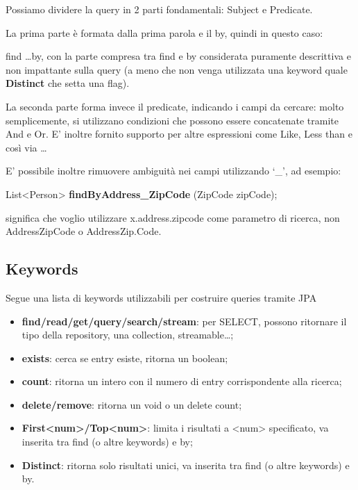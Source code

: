 Possiamo dividere la query in 2 parti fondamentali: Subject e Predicate.

La prima parte è formata dalla prima parola e il by, quindi in questo caso:

find \dots by, con la parte compresa tra find e by considerata puramente descrittiva e non impattante sulla query (a meno che non venga utilizzata una keyword quale \textbf{Distinct} che setta una flag).

La seconda parte forma invece il predicate, indicando i campi da cercare: molto semplicemente, si utilizzano condizioni che possono essere concatenate tramite And e Or. E' inoltre fornito supporto per altre espressioni come Like, Less than e così via \dots 

E' possibile inoltre rimuovere ambiguità nei campi utilizzando `\_', ad esempio:

List<Person> \textbf{findByAddress\_ZipCode} (ZipCode zipCode);

significa che voglio utilizzare x.address.zipcode come parametro di ricerca, non AddressZipCode o AddressZip.Code.

\subsection{Keywords}
Segue una lista di keywords utilizzabili per costruire queries tramite JPA\@
\begin{itemize}
    \item \textbf{find/read/get/query/search/stream}: per SELECT, possono ritornare il tipo della repository, una collection, streamable\dots;
    \item \textbf{exists}: cerca se entry esiste, ritorna un boolean;
    \item \textbf{count}: ritorna un intero con il numero di entry corrispondente alla ricerca;
    \item \textbf{delete/remove}: ritorna un void o un delete count;
    \item \textbf{First<num>/Top<num>}: limita i risultati a <num> specificato, va inserita tra find (o altre keywords) e by;
    \item \textbf{Distinct}: ritorna solo risultati unici, va inserita tra find (o altre keywords) e by.
\end{itemize}